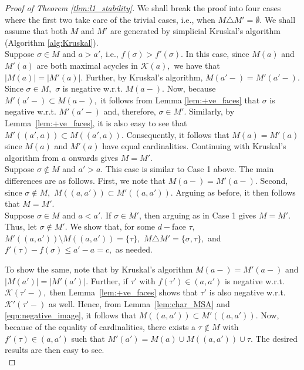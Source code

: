 \documentclass[12pt]{amsart}
\newcommand{\gt}[1]{\textcolor{blue}{#1}}
\newcommand{\remove}[1]{}
\renewcommand{\gt}[1]{#1}
\numberwithin{equation}{section}
\numberwithin{theorem}{section}
\newcommand{\1}{\mathbf{1}}
\def\K{\mathcal{K}}
\begin{document}
\begin{proof}[Proof of Theorem \ref{thm:l1_stability}]
We shall break the proof into four cases where the first two take care of the trivial cases, i.e., when $M \triangle M' = \emptyset$. We shall assume that both $M$ and $M'$ are generated by simplicial Kruskal's algorithm (Algorithm \ref{alg:Kruskal}). \\[-2ex]

 Suppose $\sigma \in M$ and $a > a'$, i.e., $f(\sigma)>f'(\sigma)$. In this case, since $M(a)$ and $M'(a)$ are both maximal acycles in $\K(a),$ we have that $|M(a)| = |M'(a)|.$ Further, by Kruskal's algorithm, $M(a'-) = M'(a'-)$. \gt{Since $\sigma \in M,$ $\sigma$ is negative w.r.t. $M(a-).$ Now, because $M'(a'-) \subset M(a-),$ it follows from Lemma \ref{lem:+ve_faces} that $\sigma$ is negative w.r.t. $M'(a'-)$ and, therefore, $\sigma \in M'.$} \remove{$\K^{d-1} \cup(a'-) \cup \sigma$ is acyclic and hence $\sigma \in M'$.} \remove{Further, since $\K^{d-1} \cup M(a-) \cup \sigma$ is acyclic,} \gt{Similarly, by Lemma~\ref{lem:+ve_faces}, it is also easy to see that $M'((a', a)) \subset M((a',a)).$ Consequently, it follows that $M(a) = M'(a)$ since $M(a)$ and $M'(a)$ have equal cardinalities.} \remove{
$M((a',a)) \subset M'$ and hence $M(a) =  M'(a)$ since $M(a),M'(a)$ have equal cardinalities.} \gt{Continuing with Kruskal's algorithm from $a$ onwards gives $M =  M'$}.\\[-2ex]

 \gt{Suppose $\sigma \notin M$ and $a' > a$. This case is similar to Case 1 above. The main differences are as follows. First, we note that $M(a-) = M'(a-).$ Second, since $\sigma \notin M,$ $M((a, a')) \subset M'((a, a')).$ Arguing as before, it then follows that $M = M'.$} \remove{In this case, $M(a'-) = M'(a'-)$ and further $\K^{d-1} \cup M'(a'-) \cup \sigma$ is cyclic by Lemma \ref{lem:+ve_SA} and so again by Kruskal's algorithm $M = M'$.} \\[-2ex]

 Suppose $\sigma \in M$ and $a < a'$. If $\sigma \in M'$, then arguing as in Case 1 gives $M = M'$. Thus, let $\sigma \notin M'$. \gt{We show that, for some $d-$face $\tau,$} $M'((a,a')) \setminus M((a,a')) = \{\tau\},$ $M \triangle M' = \{\sigma,\tau\},$ and $f'(\tau) - f(\sigma) \leq a' - a = c,$ as needed.

To show the same, note that by Kruskal's algorithm $M(a-) = M'(a-)$ and $|M(a')| = |M'(a')|$. \gt{Further, if $\tau'$ with $f(\tau') \in (a, a')$ is negative w.r.t. $\K(\tau'-),$ then Lemma~\ref{lem:+ve_faces} shows that $\tau'$ is also negative w.r.t. $\K'(\tau'-)$ as well. Hence, from Lemma~\ref{lem:char_MSA} and \eqref{eqn:negative_image}, it follows that $M((a, a')) \subset M'((a, a')).$ Now, because of the equality of cardinalities, there exists a $\tau \notin M$ with \gt{$f'(\tau) \in (a, a')$} \remove{$w(\tau) \in (a,a')$} such that $M'(a') = M(a) \cup M((a,a')) \cup \tau.$ The desired results are then easy to see.} \\[-2ex]


\end{proof}
\end{document}
